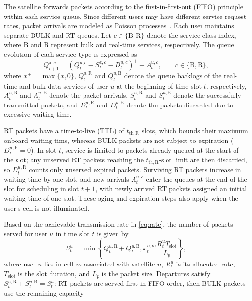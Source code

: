 \documentclass[journal]{IEEEtran}
\begin{document}
The satellite forwards packets according to the first-in-first-out (FIFO) principle within each service queue. Since different users may have different service request rates, packet arrivals are modeled as Poisson processes~\cite{ref16}. Each user maintains separate BULK and RT queues. Let $c\in\{\mathrm{B},\mathrm{R}\}$ denote the service-class index, where $\mathrm{B}$ and $\mathrm{R}$ represent bulk and real-time services, respectively. The queue evolution of each service type is expressed as
\begin{equation}
Q_{t+1}^{u,c}
=
\left(
Q_t^{u,c}
-
S_t^{u,c}
-
D_t^{u,c}
\right)^+
+
A_t^{u,c},
\qquad c\in\{\mathrm{B},\mathrm{R}\},
\end{equation}
where $x^+=\max\{x,0\}$, $Q_t^{u,\mathrm{R}}$ and $Q_t^{u,\mathrm{B}}$ denote the queue backlogs of the real-time and bulk data services of user $u$ at the beginning of time slot $t$, respectively, $A_t^{u,\mathrm{R}}$ and $A_t^{u,\mathrm{B}}$ denote the packet arrivals, $S_t^{u,\mathrm{R}}$ and $S_t^{u,\mathrm{B}}$ denote the successfully transmitted packets, and $D_t^{u,\mathrm{R}}$ and $D_t^{u,\mathrm{B}}$ denote the packets discarded due to excessive waiting time.

RT packets have a time-to-live (TTL) of $t_{\mathrm{th},\mathrm{R}}$ slots, which bounds their maximum onboard waiting time, whereas BULK packets are not subject to expiration ($D_t^{u,\mathrm{B}}=0$). In slot $t$, service is limited to packets already queued at the start of the slot; any unserved RT packets reaching the $t_{\mathrm{th},\mathrm{R}}$-slot limit are then discarded, so $D_t^{u,\mathrm{R}}$ counts only unserved expired packets. Surviving RT packets increase in waiting time by one slot, and new arrivals $A_t^{u,c}$ enter the queues at the end of the slot for scheduling in slot $t+1$, with newly arrived RT packets assigned an initial waiting time of one slot. These aging and expiration steps also apply when the user's cell is not illuminated.

Based on the achievable transmission rate in \eqref{eq:rate}, the number of packets served for user $u$ in time slot $t$ is given by
\begin{equation}
S_t^{u}
=
\min
\left\{
Q_t^{u,\mathrm{R}}+Q_t^{u,\mathrm{B}},
x_t^{n,m}\frac{R_t^{u}T_{\mathrm{slot}}}{L_p}
\right\},
\end{equation}
where user $u$ lies in cell $m$ associated with satellite $n$, $R_t^u$ is its allocated rate, $T_{\mathrm{slot}}$ is the slot duration, and $L_p$ is the packet size. Departures satisfy $S_t^{u,\mathrm{R}}+S_t^{u,\mathrm{B}}=S_t^u$: RT packets are served first in FIFO order, then BULK packets use the remaining capacity.
\end{document}
